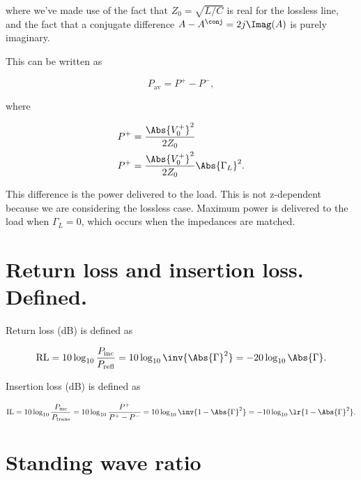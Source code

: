 where we've made use of the fact that \( Z_0 = \sqrt{L/C} \) is real for the lossless line, and the fact that a conjugate difference \( A - A^\conj = 2 j \Imag(A) \) is purely imaginary.

This can be written as

\begin{dmath}\label{eqn:uwaves4TransmissionLines:1020}
P_{ \textrm{av}} = P^{+} - P^{-},
\end{dmath}

where

\begin{equation}\label{eqn:uwaves4TransmissionLines:1040}
\begin{aligned}
P^{+} &= \frac{ \Abs{V_0^{+}}^2 }{2 Z_0 } \\
P^{+} &= \frac{ \Abs{V_0^{+}}^2 }{2 Z_0 } \Abs{\Gamma_L}^2.
\end{aligned}
\end{equation}

This difference is the power delivered to the load.  This is not z-dependent because we are considering the lossless case.  Maximum power is delivered to the load when \( \Gamma_L = 0 \), which occurs when the impedances are matched.

\section{Return loss and insertion loss.  Defined.}

Return loss (dB) is defined as

\begin{dmath}\label{eqn:uwaves4TransmissionLines:1060}
\textrm{RL} 
= 10 \log_{10} \frac{P_{\textrm{inc}}}{P_{\textrm{refl}}} 
= 10 \log_{10} \inv{\Abs{\Gamma}^2}
= -20 \log_{10} \Abs{\Gamma}.
\end{dmath}

Insertion loss (dB) is defined as

\begin{dmath}\label{eqn:uwaves4TransmissionLines:1080}
\textrm{IL} 
= 10 \log_{10} \frac{P_{\textrm{inc}}}{P_{\textrm{trans}}} 
= 10 \log_{10} \frac{P^{+}}{P^{+} - P^{-}}
= 10 \log_{10} \inv{1 - \Abs{\Gamma}^2}
= -10 \log_{10} \lr{ 1 - \Abs{\Gamma}^2 }.
\end{dmath}

\section{Standing wave ratio}

